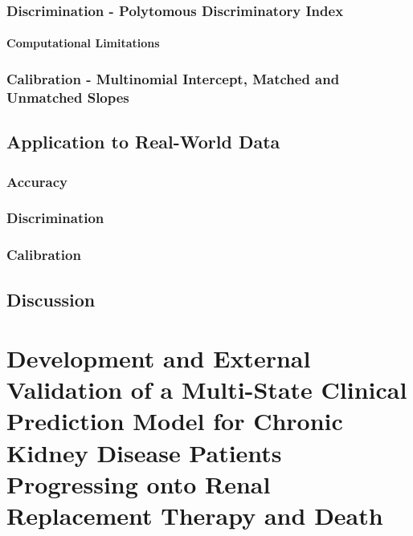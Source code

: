 \documentclass[12pt,PhD,twoside,openright]{muthesis}
\begin{document}
\hypertarget{discrimination---polytomous-discriminatory-index}{%
\subsection{Discrimination - Polytomous Discriminatory Index}\label{discrimination---polytomous-discriminatory-index}}

\hypertarget{computational-limitations}{%
\subsubsection{Computational Limitations}\label{computational-limitations}}

\hypertarget{calibration---multinomial-intercept-matched-and-unmatched-slopes}{%
\subsection{Calibration - Multinomial Intercept, Matched and Unmatched Slopes}\label{calibration---multinomial-intercept-matched-and-unmatched-slopes}}

\hypertarget{application-to-real-world-data}{%
\section{Application to Real-World Data}\label{application-to-real-world-data}}

\hypertarget{accuracy}{%
\subsection{Accuracy}\label{accuracy}}

\hypertarget{discrimination}{%
\subsection{Discrimination}\label{discrimination}}

\hypertarget{calibration}{%
\subsection{Calibration}\label{calibration}}

\hypertarget{discussion-3}{%
\section{Discussion}\label{discussion-3}}

\hypertarget{chap-dev-paper}{%
\chapter{Development and External Validation of a Multi-State Clinical Prediction Model for Chronic Kidney Disease Patients Progressing onto Renal Replacement Therapy and Death}\label{chap-dev-paper}}
\end{document}

